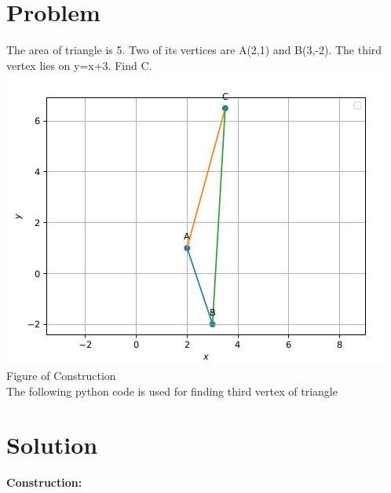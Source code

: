 \documentclass[10pt,a4paper]{report}
\begin{document}
\begin{multicols}{2}
\section{Problem}

\noindent The area of triangle is 5. Two of its vertices are A(2,1) and B(3,-2). The third vertex lies on y=x+3. Find C.\\
\includegraphics[scale=0.4]{tri.png}\\
Figure of Construction\\
The following python code is used for finding third vertex of triangle 
		  \\
\section{Solution}
\textbf{Construction: }\\


\end{multicols}
\end{document}
